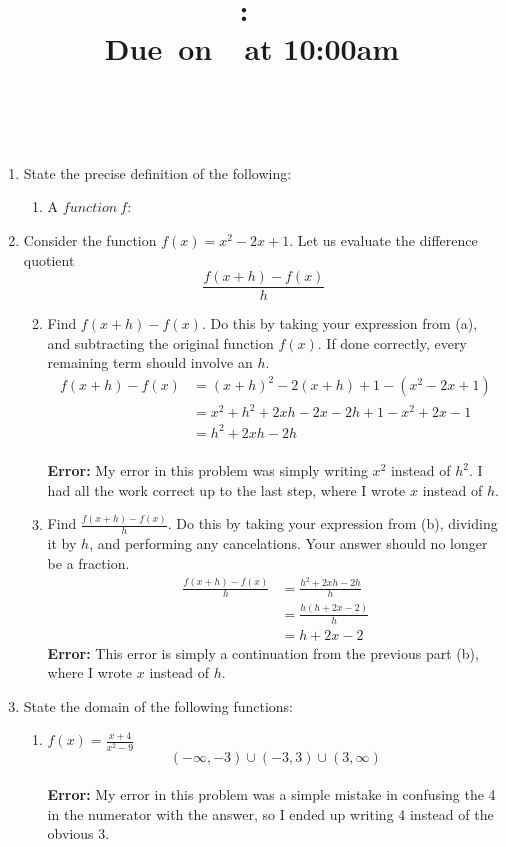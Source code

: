 \documentclass{article}
\title{
    \vspace{2in}
    \textmd{\textbf{\hmwkClass:\ \hmwkTitle}}\\
    \normalsize\vspace{0.1in}\small{Due\ on\ \hmwkDueDate\ at 10:00am}\\
    \vspace{0.1in}\large{\textit{\hmwkClassInstructor\ \hmwkClassTime}}
    \vspace{3in}
}
\author{\hmwkAuthorName}
\date{}
\begin{document}
\maketitle

\pagebreak

\begin{enumerate}
\setcounter{enumi}{0}
	\item State the precise definition of the following:
	\begin{enumerate}
		\item A $function\ f$: 
	\end{enumerate}
\setcounter{enumi}{3}
	\item Consider the function $f(x)=x^2-2x+1$. Let us evaluate the difference quotient $$\frac{f(x+h)-f(x)}{h}$$
		\begin{enumerate}
		\setcounter{enumii}{1}
		\item Find $f(x+h)-f(x)$. Do this by taking your expression from (a), and subtracting the original function $f(x)$. If done correctly, every remaining term should involve an $h$. 
		\begin{align*}
			f(x+h)-f(x)&=(x+h)^2-2(x+h)+1-(x^2-2x+1) \\
			&= x^2+h^2+2xh-2x-2h+1-x^2+2x-1 \\
			&= \boxed{h^2+2xh-2h}
		\end{align*}
		\\ \textbf{Error:} My error in this problem was simply writing $x^2$ instead of $h^2$. I had all the work correct up to the last step, where I wrote $x$ instead of $h$.
		\item Find $\frac{f(x+h)-f(x)}{h}$. Do this by taking your expression from (b), dividing it by $h$, and performing any cancelations. Your answer should no longer be a fraction.
		\begin{align*}
			\frac{f(x+h)-f(x)}{h}&=\frac{h^2+2xh-2h}{h} \\
			&= \frac{h(h+2x-2)}{h} \\
			&= \boxed{h+2x-2}
		\end{align*}
		\textbf{Error:} This error is simply a continuation from the previous part (b), where I wrote $x$ instead of $h$.
		\end{enumerate}
	\item State the domain of the following functions:
		\begin{enumerate}
			\item $f(x)=\frac{x+4}{x^2-9}$ \\ $$(-\infty, -3)\cup (-3,3) \cup (3,\infty)$$ \\ \textbf{Error:} My error in this problem was a simple mistake in confusing the 4 in the numerator with the answer, so I ended up writing 4 instead of the obvious 3.

\end{enumerate}
\end{enumerate}
\end{document}
